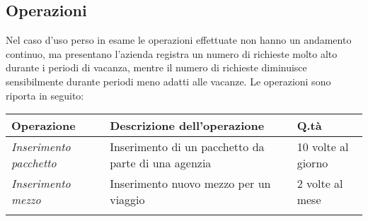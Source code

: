 \subsection{Operazioni}
Nel caso d'uso perso in esame le operazioni effettuate non hanno un andamento continuo, ma presentano l'azienda registra un numero di richieste molto alto durante i periodi di vacanza, mentre il numero di richieste diminuisce sensibilmente durante periodi meno adatti alle vacanze. Le operazioni sono riporta in seguito:
\begin{tabularx}{\textwidth}{X X p{}}
    \toprule
    \textbf{Operazione} & \textbf{Descrizione dell'operazione} & \textbf{Q.tà}
    \\
    \midrule
    \emph{Inserimento pacchetto} & Inserimento di un pacchetto da parte di una agenzia & 10 volte al giorno
    \\
    \emph{Inserimento mezzo} & Inserimento nuovo mezzo per un viaggio & 2 volte al mese
    \\
    \emph{} & &
    \\
    \bottomrule
\end{tabularx}